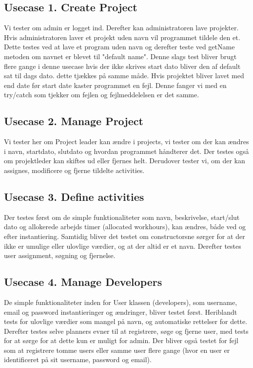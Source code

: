 \documentclass[a4paper,12pt]{article}
\begin{document}
\subsection*{Usecase 1. Create Project}
Vi tester om admin er logget ind. Derefter kan administratoren lave projekter. Hvis administratoren laver et projekt uden navn vil programmet tildele den et. Dette testes ved at lave et program uden navn og derefter teste ved getName metoden om navnet er blevet til "default name". Denne slags test bliver brugt flere gange i denne usecase hvis der ikke skrives start dato bliver den af default sat til dags dato. dette tjækkes på samme måde. Hvis projektet bliver lavet med end date før start date kaster programmet en fejl. Denne fanger vi med en try/catch som tjekker om fejlen og fejlmeddelelsen er det samme.

\subsection*{Usecase 2. Manage Project}
Vi tester her om Project leader kan ændre i projects, vi tester om der kan ændres i navn, startdato, slutdato og hvordan programmet håndterer det. Der testes også om projektleder kan skiftes ud eller fjernes helt. Derudover tester vi, om der kan assignes, modificere og fjerne tildelte activities.

\subsection*{Usecase 3. Define activities}
Der testes først om de simple funktionaliteter som navn, beskrivelse, start/slut dato og allokerede arbejds timer (allocated workhours), kan ændres, både ved og efter instantiering. Samtidig bliver det testet om constructorsne sørger for at der ikke er umulige eller ulovlige værdier, og at der altid er et navn. Derefter testes user assignment, søgning og fjernelse.

\subsection*{Usecase 4. Manage Developers}
De simple funktionaliteter inden for User klassen (developers), som username, email og password instantieringer og ændringer, bliver testet først. Heriblandt tests for ulovlige værdier som mangel på navn, og automatiske rettelser for dette. Derefter testes selve planners evner til at registrere, søge og fjerne user, med tests for at sørge for at dette kun er muligt for admin. Der bliver også testet for fejl som at registrere tomme users eller samme user flere gange (hvor en user er identificeret på sit username, password og email).
\end{document}
